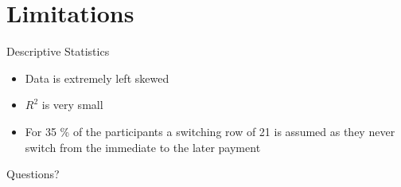 \documentclass[10pt]{beamer}
\begin{document}
\section{Limitations}
\begin{frame}[fragile] {Descriptive Statistics} 
\begin{itemize}
\item Data is extremely left skewed 
\item $R^2$ is very small 
\item For 35 \% of the participants a switching row of 21 is assumed as they never switch from the immediate to the later payment
\end{itemize}
\end{frame}

\begin{frame}[standout]
Questions? 
\end{frame}
\end{document}
